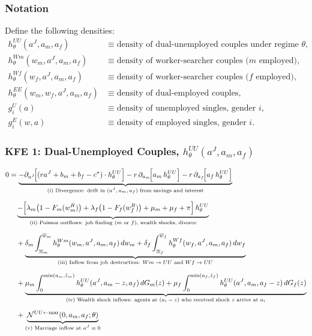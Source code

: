 \documentclass{article}
\begin{document}
\subsubsection*{Notation}

Define the following densities:
\begin{align*}
    h_\theta^{UU}(a^J, a_m, a_f) &\equiv \text{density of dual-unemployed couples under regime } \theta, \\
    h_\theta^{Wm}(w_m, a^J, a_m, a_f) &\equiv \text{density of worker-searcher couples ($m$ employed)}, \\
    h_\theta^{Wf}(w_f, a^J, a_m, a_f) &\equiv \text{density of worker-searcher couples ($f$ employed)}, \\
    h_\theta^{EE}(w_m, w_f, a^J, a_m, a_f) &\equiv \text{density of dual-employed couples}, \\
    g_i^U(a) &\equiv \text{density of unemployed singles, gender } i, \\
    g_i^E(w, a) &\equiv \text{density of employed singles, gender } i.
\end{align*}

\subsubsection*{KFE 1: Dual-Unemployed Couples, $h_\theta^{UU}(a^J, a_m, a_f)$}

\begin{align}
    0 &= \underbrace{-\partial_{a^J}\!\Big[(ra^J + b_m + b_f - c^*)\cdot h_\theta^{UU}\Big] - r\,\partial_{a_m}\!\Big[a_m\, h_\theta^{UU}\Big] - r\,\partial_{a_f}\!\Big[a_f\, h_\theta^{UU}\Big]}_{\text{(i) Divergence: drift in $(a^J, a_m, a_f)$ from savings and interest}} \notag\\[6pt]
    &\quad \underbrace{- \Big[\lambda_m\big(1-F_m(w_m^R)\big) + \lambda_f\big(1-F_f(w_f^R)\big) + \mu_m + \mu_f + \pi\Big]\, h_\theta^{UU}}_{\text{(ii) Poisson outflows: job finding ($m$ or $f$), wealth shocks, divorce}} \notag\\[6pt]
    &\quad + \underbrace{\delta_m \int_{\underline{w}_m}^{\overline{w}_m} h_\theta^{Wm}(w_m, a^J, a_m, a_f)\, dw_m + \delta_f \int_{\underline{w}_f}^{\overline{w}_f} h_\theta^{Wf}(w_f, a^J, a_m, a_f)\, dw_f}_{\text{(iii) Inflow from job destruction: $Wm\to UU$ and $Wf\to UU$}} \notag\\[6pt]
    &\quad + \underbrace{\mu_m \int_0^{\min(a_m,\bar{z}_m)} h_\theta^{UU}(a^J, a_m - z, a_f)\, dG_m(z) + \mu_f \int_0^{\min(a_f,\bar{z}_f)} h_\theta^{UU}(a^J, a_m, a_f - z)\, dG_f(z)}_{\text{(iv) Wealth shock inflows: agents at $(a_i - z)$ who received shock $z$ arrive at $a_i$}} \notag\\[6pt]
    &\quad + \underbrace{\mathcal{N}^{UU\leftarrow\text{mar}}(0, a_m, a_f;\theta)}_{\text{(v) Marriage inflow at $a^J=0$}}
    \label{eq:KFE_UU}
\end{align}
\end{document}
